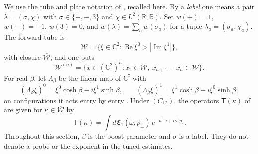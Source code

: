 \documentclass[11pt,letterpaper,reqno]{amsart}
\theoremstyle{definition}
\begin{document}
We use the tube and plate notation of \cite[Sections~8.2--8.3]{QEDConstruction}, recalled here.
By a \emph{label} one means a pair $\lambda=(\sigma,\chi)$ with $\sigma\in\{+,-,3\}$ and $\chi\in L^2(\mathbb R;\mathbb R)$.
Set $w(+)=1$, $w(-)=-1$, $w(3)=0$, and $w(\lambda)=\sum_aw(\sigma_a)$ for a tuple $\lambda_a=(\sigma_a,\chi_a)$.
The forward tube is
\begin{equation*}
\mathcal W=\{\xi\in\mathbb C^2:\operatorname{Re}\xi^0>|\operatorname{Im}\xi^1|\},
\end{equation*}
with closure $\overline{\mathcal W}$, and one puts
\begin{equation*}
\mathcal W^{(n)}=\{x\in(\mathbb C^2)^n:x_1\in\mathcal W,\ x_{a+1}-x_a\in\mathcal W\}.
\end{equation*}
For real $\beta$, let $\Lambda_\beta$ be the linear map of $\mathbb C^2$ with
\begin{equation*}
(\Lambda_\beta\xi)^0=\xi^0\cosh\beta-i\xi^1\sinh\beta,\qquad(\Lambda_\beta\xi)^1=\xi^1\cosh\beta+i\xi^0\sinh\beta;
\end{equation*}
on configurations it acts entry by entry \cite[Proposition~8.2 and Section~8.3]{QEDConstruction}.
Under $(C_{12})$, the operators $\mathsf T(\kappa)$ of \cite[Proposition~8.2 and Section~8.3]{QEDConstruction} are given for $\kappa\in\overline{\mathcal W}$ by
\begin{equation*}
\mathsf T(\kappa)=\int d\mathfrak E_1(\omega,p_\perp)\,e^{-\kappa^0\omega+i\kappa^1p_2}.
\end{equation*}
Throughout this section, $\beta$ is the boost parameter and $\sigma$ is a label. They do not denote a probe or the exponent in the tuned estimates.
\end{document}
